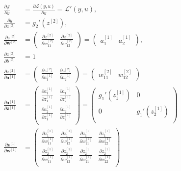 \documentclass{article}
\begin{document}
\begin{align}
\frac{\partial \mathcal{J}}{\partial y} &= \frac{\partial \mathcal{L}(y,u)}{\partial y} = \mathcal{L}'(y,u), \\
\frac{\partial y}{\partial z^{[2]}} &= g_2'(z^{[2]}), \\
\frac{\partial z^{[2]}}{\partial \textbf{w}^{[2]}} &=
\begin{pmatrix}
\frac{\partial z^{[2]}}{\partial w_{11}^{[2]}} & \frac{\partial z^{[2]}}{\partial w_{12}^{[2]}} 
\end{pmatrix} =
\begin{pmatrix}
a_1^{[1]} & a_2^{[1]} 
\end{pmatrix}, \\
\frac{\partial z^{[2]}}{\partial {b}^{[2]}} &= 1 \\
\frac{\partial z^{[2]}}{\partial \textbf{a}^{[1]}} &=
\begin{pmatrix}
\frac{\partial z^{[2]}}{\partial a_{1}^{[1]}} & \frac{\partial z^{[2]}}{\partial a_{2}^{[1]}} 
\end{pmatrix} =
\begin{pmatrix}
w_{11}^{[2]} & w_{12}^{[2]} 
\end{pmatrix} \\
\frac{\partial \textbf{a}^{[1]}}{\partial \textbf{z}^{[1]}} &=
\begin{pmatrix}
\frac{\partial a_1^{[1]}}{\partial z_1^{[1]}} & 
\frac{\partial a_1^{[1]}}{\partial z_2^{[1]}} \\
\frac{\partial a_2^{[1]}}{\partial z_1^{[1]}} & 
\frac{\partial a_2^{[1]}}{\partial z_2^{[1]}} \\
\end{pmatrix} =
\begin{pmatrix}
g_1'(z_1^{[1]}) & 0 \\
0 & g_1'(z_2^{[1]}) \\
\end{pmatrix} \\
\frac{\partial \textbf{z}^{[1]}}{\partial \textbf{w}^{[1]}} &=
\begin{pmatrix}
\frac{\partial z_1^{[1]}}{\partial w_{11}^{[1]}} & 
\frac{\partial z_1^{[1]}}{\partial w_{12}^{[1]}} &
\frac{\partial z_1^{[1]}}{\partial w_{21}^{[1]}} &
\frac{\partial z_1^{[1]}}{\partial w_{22}^{[1]}} \\
\frac{\partial z_2^{[1]}}{\partial w_{11}^{[1]}} & 
\frac{\partial z_2^{[1]}}{\partial w_{12}^{[1]}} &
\frac{\partial z_2^{[1]}}{\partial w_{21}^{[1]}} &
\frac{\partial z_2^{[1]}}{\partial w_{22}^{[1]}} \\

\end{pmatrix}
\end{align}
\end{document}
